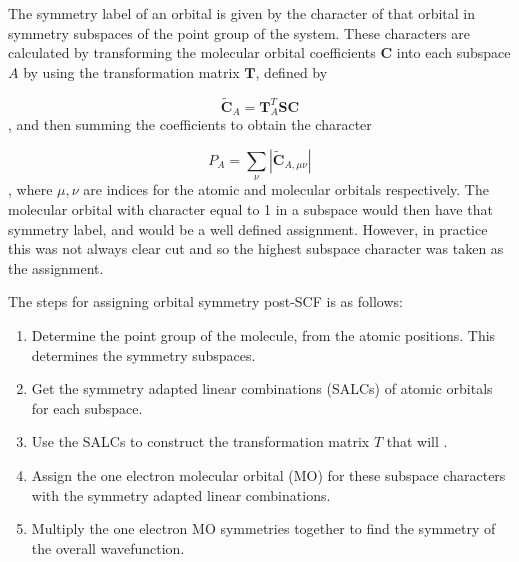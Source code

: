 The symmetry label of an orbital is given by the character of that orbital in symmetry
subspaces of the point group of the system. These characters are calculated by transforming
the molecular orbital coefficients $\mathbf{C}$ into each subspace $A$ by using
the transformation matrix $\mathbf{T}$, defined by

\begin{equation}
\tilde{\mathbf{C}}_A = \mathbf{T}^T_A \mathbf{S} \mathbf{C}
\end{equation}
%
, and then summing the coefficients to obtain the character

\begin{equation}
P_A = \sum_{\nu} \left\lvert \tilde{\mathbf{C}}_{A, \mu\nu} \right\rvert
\end{equation}
%
, where $\mu,\nu$ are indices for the atomic and molecular orbitals respectively. 
The molecular orbital with character equal to 1 in a subspace would then have that
symmetry label, and would be a well defined assignment. However, in practice this was
not always clear cut and so the highest subspace character was taken as the assignment.

The steps for assigning orbital symmetry post-SCF is as follows:

\begin{enumerate}
    \item Determine the point group of the molecule, from the atomic positions. This
    determines the symmetry subspaces.
    \item Get the symmetry adapted linear combinations (SALCs) of atomic orbitals for 
    each subspace.
    \item Use the SALCs to construct the transformation matrix $T$ that will .
    \item Assign the one electron molecular orbital (MO) for these subspace characters
     with the symmetry adapted linear combinations.
    \item Multiply the one electron MO symmetries together to find the symmetry 
    of the overall wavefunction.
\end{enumerate}

